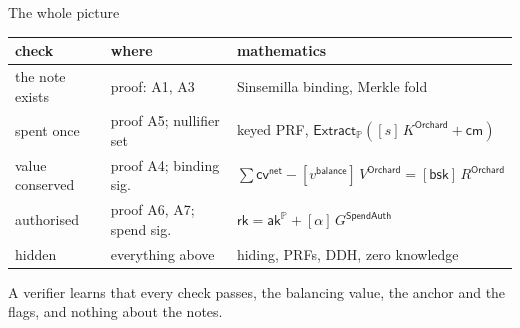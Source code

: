 \documentclass[aspectratio=169,11pt]{beamer}
\newcommand{\cmsym}{\ensuremath{\mathsf{cm}}}
\newcommand{\cvsym}{\ensuremath{\mathsf{cv}}}
\newcommand{\rksym}{\ensuremath{\mathsf{rk}}}
\newcommand{\aksym}{\ensuremath{\mathsf{ak}}}
\newcommand{\Extract}{\ensuremath{\mathsf{Extract}}}
\newcommand{\PP}{\mathbb{P}}
\newcommand{\Ext}{\Extract_{\PP}}
\newcommand{\akP}{\aksym^{\PP}}
\newcommand{\rk}{\rksym}
\newcommand{\VO}{V^{\mathsf{Orchard}}}
\newcommand{\RO}{R^{\mathsf{Orchard}}}
\newcommand{\KO}{K^{\mathsf{Orchard}}}
\newcommand{\GS}{G^{\mathsf{SpendAuth}}}
\newcommand{\cvnet}{\cvsym^{\mathsf{net}}}
\newcommand{\vb}{v^{\mathsf{balance}}}
\begin{document}
\begin{frame}{The whole picture}
\begin{center}
\small
\begin{tabular}{@{}lll@{}}
\toprule
check & where & mathematics \\
\midrule
the note exists & proof: A1, A3 & Sinsemilla binding, Merkle fold \\
spent once & proof A5; nullifier set & keyed PRF, $\Ext([s]\,\KO + \cmsym)$ \\
value conserved & proof A4; binding sig. & $\sum \cvnet - [\vb]\,\VO = [\mathsf{bsk}]\,\RO$ \\
authorised & proof A6, A7; spend sig. & $\rk = \akP + [\alpha]\,\GS$ \\
hidden & everything above & hiding, PRFs, DDH, zero knowledge \\
\bottomrule
\end{tabular}
\end{center}
\vfill
A verifier learns that every check passes, the balancing value, the anchor
and the flags, and nothing about the notes.
\end{frame}
\end{document}
